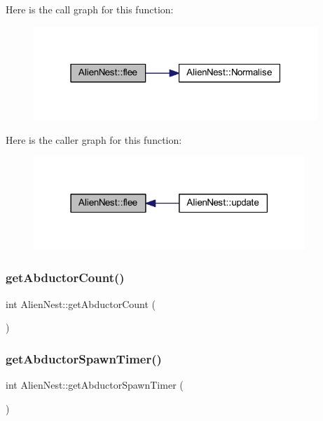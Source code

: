 Here is the call graph for this function\+:
\nopagebreak
\begin{figure}[H]
\begin{center}
\leavevmode
\includegraphics[width=304pt]{class_alien_nest_a79b79e01b2c2c191a62f6522e62e7093_cgraph}
\end{center}
\end{figure}
Here is the caller graph for this function\+:
\nopagebreak
\begin{figure}[H]
\begin{center}
\leavevmode
\includegraphics[width=290pt]{class_alien_nest_a79b79e01b2c2c191a62f6522e62e7093_icgraph}
\end{center}
\end{figure}
\mbox{\label{class_alien_nest_ac5004adc73493a1f3f0807cd03b522c8}} 
\subsubsection{\texorpdfstring{get\+Abductor\+Count()}{getAbductorCount()}}
{\footnotesize\ttfamily int Alien\+Nest\+::get\+Abductor\+Count (\begin{DoxyParamCaption}{ }\end{DoxyParamCaption})}

\mbox{\label{class_alien_nest_ad8eb2e360b956e44ec9da1d0da42cf88}} 
\subsubsection{\texorpdfstring{get\+Abductor\+Spawn\+Timer()}{getAbductorSpawnTimer()}}
{\footnotesize\ttfamily int Alien\+Nest\+::get\+Abductor\+Spawn\+Timer (\begin{DoxyParamCaption}{ }\end{DoxyParamCaption})}

